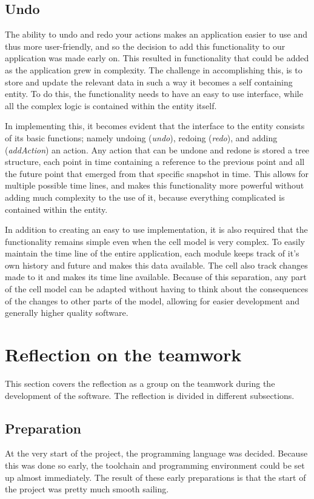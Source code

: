\documentclass[10pt,a4paper]{report}
\begin{document}
		\subsection{Undo}
			The ability to undo and redo your actions makes an application easier to use and thus more user-friendly, and so the decision to add this functionality to our application was made early on. This resulted in functionality that could be added as the application grew in complexity. The challenge in accomplishing this, is to store and update the relevant data in such a way it becomes a self containing entity. To do this, the functionality needs to have an easy to use interface, while all the complex logic is contained within the entity itself.
			
			In implementing this, it becomes evident that the interface to the entity consists of its basic functions; namely undoing (\emph{undo}), redoing (\emph{redo}), and adding (\emph{addAction}) an action. Any action that can be undone and redone is stored a tree structure, each point in time containing a reference to the previous point and all the future point that emerged from that specific snapshot in time. This allows for multiple possible time lines, and makes this functionality more powerful without adding much complexity to the use of it, because everything complicated is contained within the entity.

			In addition to creating an easy to use implementation, it is also required that the functionality remains simple even when the cell model is very complex. To easily maintain the time line of the entire application, each module keeps track of it's own history and future and makes this data available. The cell also track changes made to it and makes its time line available. Because of this separation, any part of the cell model can be adapted without having to think about the consequences of the changes to other parts of the model, allowing for easier development and generally higher quality software.
	\clearpage
	\section{Reflection on the teamwork}
		This section covers the reflection as a group on the teamwork during the development of the software. The reflection is divided in different subsections.
		\subsection{Preparation}
			At the very start of the project, the programming language was decided. Because this was done so early, the toolchain and programming environment could be set up almost immediately. The result of these early preparations is that the start of the project was pretty much smooth sailing.
			
\end{document}
